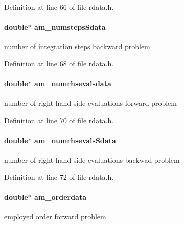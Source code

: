 Definition at line 66 of file rdata.\+h.

\hypertarget{struct_return_data_a6852d3762d59842903ef737ed511dc43}{}
\paragraph[{am\+\_\+numsteps\+Sdata}]{\setlength{\rightskip}{0pt plus 5cm}double$\ast$ am\+\_\+numsteps\+Sdata}\label{struct_return_data_a6852d3762d59842903ef737ed511dc43}
number of integration steps backward problem 

Definition at line 68 of file rdata.\+h.

\hypertarget{struct_return_data_a480d4eb0a1a568f64b8e939105a0b627}{}
\paragraph[{am\+\_\+numrhsevalsdata}]{\setlength{\rightskip}{0pt plus 5cm}double$\ast$ am\+\_\+numrhsevalsdata}\label{struct_return_data_a480d4eb0a1a568f64b8e939105a0b627}
number of right hand side evaluations forward problem 

Definition at line 70 of file rdata.\+h.

\hypertarget{struct_return_data_a77e958126968de6f5ee3bd1d22129641}{}
\paragraph[{am\+\_\+numrhsevals\+Sdata}]{\setlength{\rightskip}{0pt plus 5cm}double$\ast$ am\+\_\+numrhsevals\+Sdata}\label{struct_return_data_a77e958126968de6f5ee3bd1d22129641}
number of right hand side evaluations backwad problem 

Definition at line 72 of file rdata.\+h.

\hypertarget{struct_return_data_af792e4a1c5c23c5232ef9398e25de1a7}{}
\paragraph[{am\+\_\+orderdata}]{\setlength{\rightskip}{0pt plus 5cm}double$\ast$ am\+\_\+orderdata}\label{struct_return_data_af792e4a1c5c23c5232ef9398e25de1a7}
employed order forward problem 

